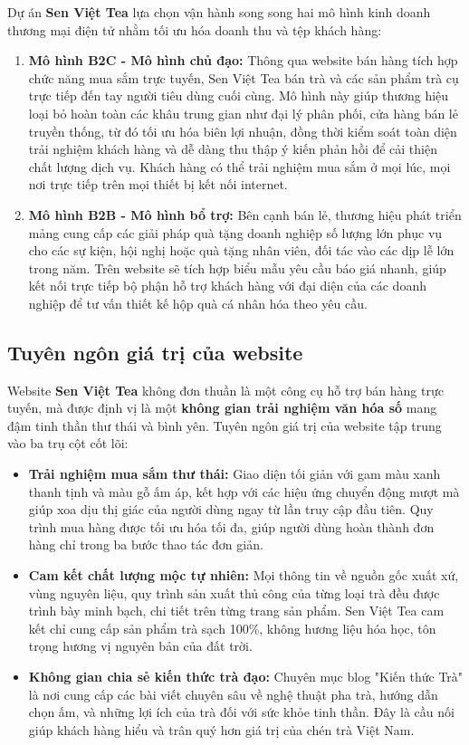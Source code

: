 Dự án \textbf{Sen Việt Tea} lựa chọn vận hành song song hai mô hình kinh doanh thương mại điện tử nhằm tối ưu hóa doanh thu và tệp khách hàng:
\begin{enumerate}
    \item \textbf{Mô hình B2C - Mô hình chủ đạo:} 
    Thông qua website bán hàng tích hợp chức năng mua sắm trực tuyến, Sen Việt Tea bán trà và các sản phẩm trà cụ trực tiếp đến tay người tiêu dùng cuối cùng. Mô hình này giúp thương hiệu loại bỏ hoàn toàn các khâu trung gian như đại lý phân phối, cửa hàng bán lẻ truyền thống, từ đó tối ưu hóa biên lợi nhuận, đồng thời kiểm soát toàn diện trải nghiệm khách hàng và dễ dàng thu thập ý kiến phản hồi để cải thiện chất lượng dịch vụ. Khách hàng có thể trải nghiệm mua sắm ở mọi lúc, mọi nơi trực tiếp trên mọi thiết bị kết nối internet.
    
    \item \textbf{Mô hình B2B - Mô hình bổ trợ:}
    Bên cạnh bán lẻ, thương hiệu phát triển mảng cung cấp các giải pháp quà tặng doanh nghiệp số lượng lớn phục vụ cho các sự kiện, hội nghị hoặc quà tặng nhân viên, đối tác vào các dịp lễ lớn trong năm. Trên website sẽ tích hợp biểu mẫu yêu cầu báo giá nhanh, giúp kết nối trực tiếp bộ phận hỗ trợ khách hàng với đại diện của các doanh nghiệp để tư vấn thiết kế hộp quà cá nhân hóa theo yêu cầu.
\end{enumerate}

\subsection{Tuyên ngôn giá trị của website}

Website \textbf{Sen Việt Tea} không đơn thuần là một công cụ hỗ trợ bán hàng trực tuyến, mà được định vị là một \textbf{không gian trải nghiệm văn hóa số} mang đậm tinh thần thư thái và bình yên. Tuyên ngôn giá trị của website tập trung vào ba trụ cột cốt lõi:
\begin{itemize}
    \item \textbf{Trải nghiệm mua sắm thư thái:} Giao diện tối giản với gam màu xanh thanh tịnh và màu gỗ ấm áp, kết hợp với các hiệu ứng chuyển động mượt mà giúp xoa dịu thị giác của người dùng ngay từ lần truy cập đầu tiên. Quy trình mua hàng được tối ưu hóa tối đa, giúp người dùng hoàn thành đơn hàng chỉ trong ba bước thao tác đơn giản.
    \item \textbf{Cam kết chất lượng mộc tự nhiên:} Mọi thông tin về nguồn gốc xuất xứ, vùng nguyên liệu, quy trình sản xuất thủ công của từng loại trà đều được trình bày minh bạch, chi tiết trên từng trang sản phẩm. Sen Việt Tea cam kết chỉ cung cấp sản phẩm trà sạch 100\%, không hương liệu hóa học, tôn trọng hương vị nguyên bản của đất trời.
    \item \textbf{Không gian chia sẻ kiến thức trà đạo:} Chuyên mục blog "Kiến thức Trà" là nơi cung cấp các bài viết chuyên sâu về nghệ thuật pha trà, hướng dẫn chọn ấm, và những lợi ích của trà đối với sức khỏe tinh thần. Đây là cầu nối giúp khách hàng hiểu và trân quý hơn giá trị của chén trà Việt Nam.
\end{itemize}

